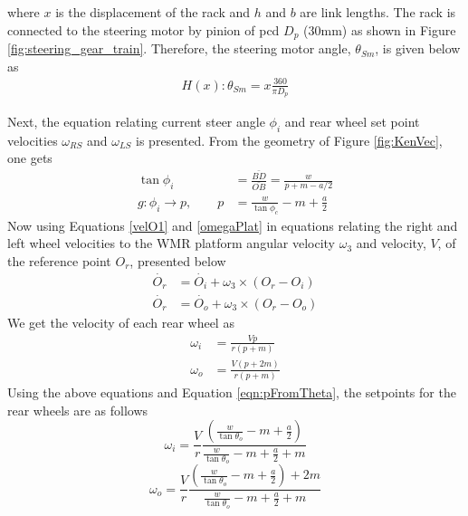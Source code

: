 where $x$ is the displacement of the rack and $h$ and $b$ are link lengths. The rack is connected to the steering motor by pinion of pcd $D_p$ (30mm) as shown in  Figure \ref{fig:steering_gear_train}. Therefore, the steering motor angle,  $ \theta_{Sm}$, is given below as
\begin{eqnarray}
H(x): \theta_{Sm}= x \frac{360}{\pi D_p}
\label{eqn:sterineq2}
\end{eqnarray}
 
Next,  the equation relating current steer angle $\phi_{i}$   and rear wheel  set point velocities $\omega_{RS}$ and $\omega_{LS}$ is presented. From the geometry of Figure \ref{fig:KenVec}, one gets
\begin{align}
\nonumber \tan\phi_{i} &=\frac{\bar{BD}}{\bar{OB}}=\frac{w}{p+m-a/2}\\ 
g:\phi_{i} \rightarrow p,\quad \quad p &= \frac{w}{\tan\phi_{c}}-m + \frac{a}{2}
\label{eqn:pFromTheta}
\end{align}
Now using Equations \ref{velO1} and \ref{omegaPlat}  in equations relating the right and left wheel velocities to the WMR platform angular velocity $\omega_3$ and velocity, $V$, of the reference point $O_r$, presented below
\begin{align*}
\dot{O_r}&=\dot{O_i}+\omega_3 \times (O_r-O_i)\\
\dot{O_r}&=\dot{O_o}+\omega_3 \times (O_r-O_o)
\end{align*}
 We get the  velocity of each rear wheel as  
\begin{align}
\nonumber \omega_i&=\frac{Vp}{r(p+m)}\\
\nonumber \omega_o &=\frac{V(p+2m)}{r(p+m)}
\end{align}
Using the above equations and Equation \ref{eqn:pFromTheta},  the setpoints for the rear wheels are as follows 
\begin{equation}
\omega_i =\frac{V}{r}\frac{( \frac{w}{\tan\theta_o}-m + \frac{a}{2})}{ \frac{w}{\tan\theta_o}-m + \frac{a}{2}+m}
\end{equation}
\begin{equation}
\omega_o =\frac{V}{r}\frac{( \frac{w}{\tan\theta_o}-m + \frac{a}{2})+2m}{ \frac{w}{\tan\theta_o}-m + \frac{a}{2}+m}
\end{equation}
 

